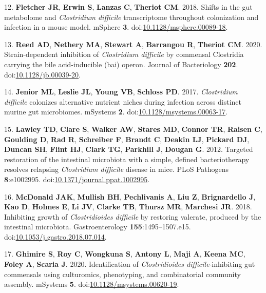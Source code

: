 \documentclass[11pt,]{article}
\newlength{\cslhangindent}
\newenvironment{cslreferences}%
  {\setlength{\parindent}{0pt}%
  \everypar{\setlength{\hangindent}{\cslhangindent}}\ignorespaces}%
  {\par}
\begin{document}
\begin{cslreferences}
\leavevmode\hypertarget{ref-fletcher2018}{}%
12. \textbf{Fletcher JR}, \textbf{Erwin S}, \textbf{Lanzas C},
\textbf{Theriot CM}. 2018. Shifts in the gut metabolome and
\emph{Clostridium difficile} transcriptome throughout colonization and
infection in a mouse model. mSphere \textbf{3}.
doi:\href{https://doi.org/10.1128/msphere.00089-18}{10.1128/msphere.00089-18}.

\leavevmode\hypertarget{ref-reed2020}{}%
13. \textbf{Reed AD}, \textbf{Nethery MA}, \textbf{Stewart A},
\textbf{Barrangou R}, \textbf{Theriot CM}. 2020. Strain-dependent
inhibition of \emph{Clostridium difficile} by commensal Clostridia
carrying the bile acid-inducible (bai) operon. Journal of Bacteriology
\textbf{202}.
doi:\href{https://doi.org/10.1128/jb.00039-20}{10.1128/jb.00039-20}.

\leavevmode\hypertarget{ref-jenior2017}{}%
14. \textbf{Jenior ML}, \textbf{Leslie JL}, \textbf{Young VB},
\textbf{Schloss PD}. 2017. \emph{Clostridium difficile} colonizes
alternative nutrient niches during infection across distinct murine gut
microbiomes. mSystems \textbf{2}.
doi:\href{https://doi.org/10.1128/msystems.00063-17}{10.1128/msystems.00063-17}.

\leavevmode\hypertarget{ref-lawley2012}{}%
15. \textbf{Lawley TD}, \textbf{Clare S}, \textbf{Walker AW},
\textbf{Stares MD}, \textbf{Connor TR}, \textbf{Raisen C},
\textbf{Goulding D}, \textbf{Rad R}, \textbf{Schreiber F},
\textbf{Brandt C}, \textbf{Deakin LJ}, \textbf{Pickard DJ},
\textbf{Duncan SH}, \textbf{Flint HJ}, \textbf{Clark TG},
\textbf{Parkhill J}, \textbf{Dougan G}. 2012. Targeted restoration of
the intestinal microbiota with a simple, defined bacteriotherapy
resolves relapsing \emph{Clostridium difficile} disease in mice. PLoS
Pathogens \textbf{8}:e1002995.
doi:\href{https://doi.org/10.1371/journal.ppat.1002995}{10.1371/journal.ppat.1002995}.

\leavevmode\hypertarget{ref-mcdonald2018}{}%
16. \textbf{McDonald JAK}, \textbf{Mullish BH}, \textbf{Pechlivanis A},
\textbf{Liu Z}, \textbf{Brignardello J}, \textbf{Kao D}, \textbf{Holmes
E}, \textbf{Li JV}, \textbf{Clarke TB}, \textbf{Thursz MR},
\textbf{Marchesi JR}. 2018. Inhibiting growth of \emph{Clostridioides
difficile} by restoring valerate, produced by the intestinal microbiota.
Gastroenterology \textbf{155}:1495--1507.e15.
doi:\href{https://doi.org/10.1053/j.gastro.2018.07.014}{10.1053/j.gastro.2018.07.014}.

\leavevmode\hypertarget{ref-ghimire2019}{}%
17. \textbf{Ghimire S}, \textbf{Roy C}, \textbf{Wongkuna S},
\textbf{Antony L}, \textbf{Maji A}, \textbf{Keena MC}, \textbf{Foley A},
\textbf{Scaria J}. 2020. Identification of \emph{Clostridioides
difficile}-inhibiting gut commensals using culturomics, phenotyping, and
combinatorial community assembly. mSystems \textbf{5}.
doi:\href{https://doi.org/10.1128/msystems.00620-19}{10.1128/msystems.00620-19}.


\end{cslreferences}
\end{document}
